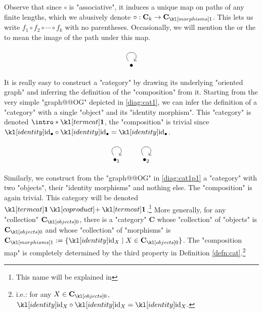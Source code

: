 \documentclass[main.tex]{subfiles}
\begin{document}
Observe that since $\circ$ is "associative", it induces a unique  map on paths of any finite lengths, which we abusively denote $\circ: \mathbf{C}_k \rightarrow \mor{\mathbf{C}}$. This lets us write $f_1 \circ f_2 \circ \cdots \circ f_k$ with no parentheses. \AP Occasionally, we will mention the  or the  to mean the image of the path under this map.
\begin{exmps}\label{exmp:simplecats}
	\begin{marginfigure}[5\baselineskip]\begin{equation}\label{diag:cat1}\begin{tikzcd}\bullet \arrow[loop, distance=2em, in=55, out=125]\end{tikzcd}\end{equation}\end{marginfigure} 
	It is really easy to construct a "category" by drawing its underlying "oriented graph" and inferring the definition of the "composition" from it. Starting from the very simple "graph@@OG" depicted in \eqref{diag:cat1}, we can infer the definition of a "category" with a single "object" and its "identity morphism". \AP This "category" is denoted $\intro*\termcat$, the "composition" is trivial since $\id_{\bullet} \circ \id_{\bullet} = \id_{\bullet}$.

	\begin{marginfigure}[1\baselineskip]\begin{equation}\label{diag:cat1p1}\begin{tikzcd}\bullet_1 \arrow[loop, distance=2em, in=55, out=125]&\bullet_2 \arrow[loop, distance=2em, in=55, out=125]\end{tikzcd}\end{equation}\end{marginfigure}
	Similarly, we construct from the "graph@@OG" in \eqref{diag:cat1p1} a "category" with two "objects", their "identity morphisms" and nothing else. The "composition" is again trivial. This category will be denoted $\termcat \coproduct \termcat$.\footnote{This name will be explained in } %
	More generally, for any "collection" $\obj{\mathbf{C}}$, there is a "category" $\mathbf{C}$ whose "collection" of "objects" is $\obj{\mathbf{C}}$ and whose "collection" of "morphisms" is $\mor{\mathbf{C}} := \{\id_X \mid X \in \obj{\mathbf{C}}\}$. The "composition map" is completely determined by the third property in Definition \ref{defn:cat}.\footnote{i.e.: for any $X \in \obj{\mathbf{C}}$, $\id_X \circ \id_X = \id_X$.}
	

\end{exmps}
\end{document}
